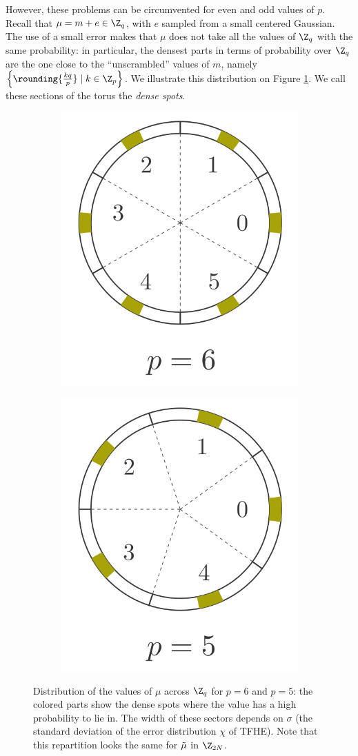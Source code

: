 However, these problems can be circumvented for even and odd values of $p$. Recall that $\mu = m + e \in \Z_q$, with $e$ sampled from a small centered Gaussian. The use of a small error makes that $\mu$ does not take all the values of $\Z_q$ with the same probability: in particular, the densest parts in terms of probability over $\Z_q$ are the one close to the ``unscrambled'' values of $m$, namely $\left \{ \rounding{\frac {k q}{p}} \mid k \in \Z_p \right \}$. We illustrate this distribution on Figure \ref{fig:density_of_phase}. We call these sections of the torus the \emph{dense spots}.


\begin{figure}
    \begin{subfigure}{0.49\linewidth}
        \centering
        \includegraphics[width=0.5\linewidth]{img/to_harmonize/busy_sectors_2.png}
    \end{subfigure}\hspace{1em}%
    \begin{subfigure}{0.49\linewidth}%
        \centering
        \includegraphics[width=0.5\linewidth]{img/to_harmonize/busy_sectors.png}
    \end{subfigure}
    \caption{Distribution of the values of $\mu$ across $\Z_{q}$ for $p = 6$ and $p = 5$: the colored parts show the dense spots where the value has a high probability to lie in. The width of these sectors depends on $\sigma$ (the standard deviation of the error distribution $\chi$ of TFHE). Note that this repartition looks the same for $\Tilde{\mu}$ in $\Z_{2N}$.}    
    \label{fig:density_of_phase}
\end{figure}


